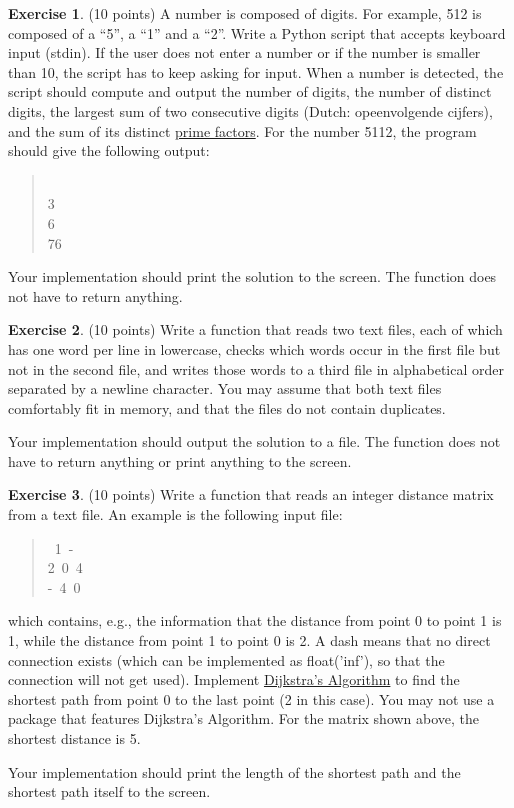 \documentclass[a4paper]{report}
\theoremstyle{definition}
\newtheorem{exercise}{Exercise}
\newcommand{\blankline}{\par\vspace{5mm}}
\begin{document}
\begin{exercise}
	(10 points) A number is composed of digits. For example, 512 is composed of a “5”, a “1” and  a “2”. Write a Python script that accepts keyboard input (stdin). If the user does not enter a number or if the number is smaller than 10, the script has to keep asking for input. When a number is detected, the script should compute and output the number of digits, the number of distinct digits, the largest sum of two consecutive digits  (Dutch: opeenvolgende cijfers), and the sum of its distinct \href{https://en.wikipedia.org/wiki/Prime_factor}{prime factors}. For the number 5112, the program should give the following output:
	
	\begin{quote}{\ttfamily \raggedright {}\\
			3\\
			6\\
			76
		}
	\end{quote}

	\noindent Your implementation should print the solution to the screen. The function does not have to return anything.
\end{exercise}

\begin{exercise}
	(10 points) Write a function that reads two text files, each of which has one word per line in lowercase, checks which words occur in
	the first file but not in the second file, and writes those words to a third file in alphabetical order separated by a newline character. You	may assume that both text files comfortably fit in memory, and that the	files do not contain duplicates.
	
	\blankline \noindent Your implementation should output the solution to a file. The function does not have to return anything or print anything to the screen.	
\end{exercise}

\begin{exercise}
	(10 points) Write a function that reads an integer distance matrix from a text file. An example is the following input file:
	\begin{quote}{\ttfamily \raggedright {}~1~-\\
			2~0~4\\
			-~4~0
		}
	\end{quote}

	\noindent which contains, e.g., the information that the distance from point 0 to point 1 is 1, while the distance from point 1 to point 0 is 2. A dash means that no direct connection exists (which can be implemented as float('inf'), so that the connection will not get used). Implement \href{https://en.wikipedia.org/wiki/Dijkstra's_algorithm\#Pseudocode}{Dijkstra’s Algorithm} to find the shortest path from point 0 to the last point (2 in this case). You may not use a package that features Dijkstra’s Algorithm. For the matrix shown above, the shortest distance is 5.

	Your implementation should print the length of the shortest path and the shortest path itself to the screen.
\end{exercise}
\end{document}
